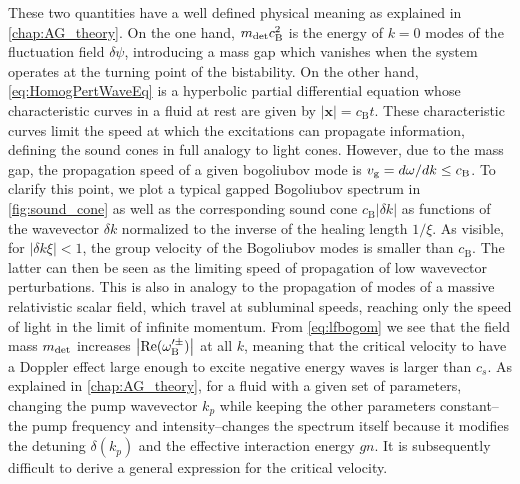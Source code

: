 These two quantities have a well defined physical meaning as explained in \autoref{chap:AG_theory}. 
On the one hand, $m_{\mathrm{det}} c_\mathrm{B}^2$ is the energy of $k=0$ modes of the fluctuation field $\delta \psi$, introducing a mass gap which vanishes when the system operates at the turning point of the bistability.
On the other hand, \autoref{eq:HomogPertWaveEq} is a hyperbolic partial differential equation whose characteristic curves in a fluid at rest are given by $|\pmb{x}|=c_\mathrm{B} t$. These characteristic curves limit the speed at which the excitations can propagate information, defining the sound cones in full analogy to light cones. However, due to the mass gap, the propagation speed of a given bogoliubov mode is $v_{\rm g}=d\omega/dk\leq c_\mathrm{B}$. 
To clarify this point, we plot a typical gapped Bogoliubov spectrum in \autoref{fig:sound_cone} as well as the corresponding sound cone $c_\mathrm{B}|\delta k|$ as functions of the wavevector $\delta k$ normalized to the inverse of the healing length $1/\xi$. As visible, for $|\delta k \xi|<1$, the group velocity of the Bogoliubov modes is smaller than $c_\mathrm{B}$.
The latter can then be seen as the limiting speed of propagation of low wavevector perturbations. This is also in analogy to the propagation of modes of a massive relativistic scalar field, which travel at subluminal speeds, reaching only the speed of light in the limit of infinite momentum.
From \autoref{eq:lfbogom} we see that the field mass $m_{\mathrm{det}}$ increases $\abs{\mathrm{Re}(\omega_\mathrm{B}^{\prime\pm})}$ at all $k$, meaning that the critical velocity to have a Doppler effect large enough to excite negative energy  waves is larger than $c_s$.
As explained in \autoref{chap:AG_theory}, for a fluid with a given set of parameters, changing the pump wavevector $k_p$ while keeping the other parameters constant--the pump frequency and intensity--changes the spectrum itself 
because it modifies the detuning $\delta(k_p)$ and the effective interaction energy $gn$. It is subsequently difficult to derive a general expression for the critical velocity.

